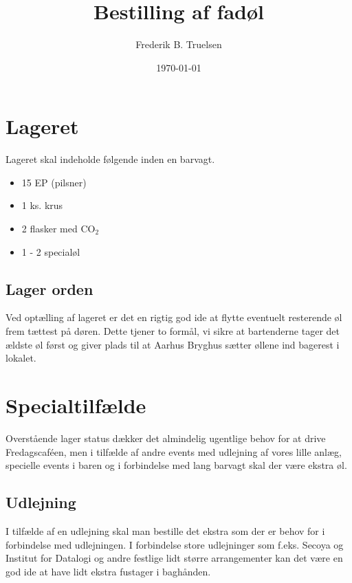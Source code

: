 

\title{Bestilling af fadøl}
\date{\today}
\author{Frederik B. Truelsen}



\maketitle

\section{Lageret}

Lageret skal indeholde følgende inden en barvagt.

\begin{itemize}
\item 15 EP (pilsner)
\item 1 ks. krus
\item 2 flasker med CO$_{2}$
\item 1 - 2 specialøl
\end{itemize}

\subsection{Lager orden}

Ved optælling af lageret er det en rigtig god ide at flytte eventuelt resterende øl frem tættest på døren.
Dette tjener to formål, vi sikre at bartenderne tager det ældste øl først og giver plads til at Aarhus Bryghus
sætter øllene ind bagerest i lokalet.

\section{Specialtilfælde}

Overstående lager status dækker det almindelig ugentlige behov for at drive Fredagscaféen,
men i tilfælde af andre events med udlejning af vores lille anlæg, specielle events i baren og
i forbindelse med lang barvagt skal der være ekstra øl.

\subsection{Udlejning}

I tilfælde af en udlejning skal man bestille det ekstra som der er behov for i forbindelse med
udlejningen. I forbindelse store udlejninger som f.eks. Secoya og Institut for Datalogi og andre
festlige lidt større arrangementer  kan det være en god ide at have lidt ekstra fustager i baghånden.

